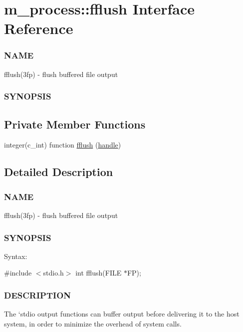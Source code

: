 \hypertarget{interfacem__process_1_1fflush}{}\section{m\+\_\+process\+:\+:fflush Interface Reference}
\label{interfacem__process_1_1fflush}


\subsubsection*{N\+A\+ME}

fflush(3fp) -\/ flush buffered file output \subsubsection*{S\+Y\+N\+O\+P\+S\+IS} 


\subsection*{Private Member Functions}
\begin{DoxyCompactItemize}
\item 
integer(c\+\_\+int) function \hyperlink{interfacem__process_1_1fflush_a77d0db933d548b3ee20b064e705a408e}{fflush} (\hyperlink{leave__watchgroup_83_8txt_ad6c5ebd26f707ef8da754021612a7c8d}{handle})
\end{DoxyCompactItemize}


\subsection{Detailed Description}
\subsubsection*{N\+A\+ME}

fflush(3fp) -\/ flush buffered file output \subsubsection*{S\+Y\+N\+O\+P\+S\+IS}

Syntax\+:

\#include $<$stdio.\+h$>$ int fflush(\+F\+I\+L\+E $\ast$\+F\+P); \subsubsection*{D\+E\+S\+C\+R\+I\+P\+T\+I\+ON}

The `stdio\textquotesingle{} output functions can buffer output before delivering it to the host system, in order to minimize the overhead of system calls.

